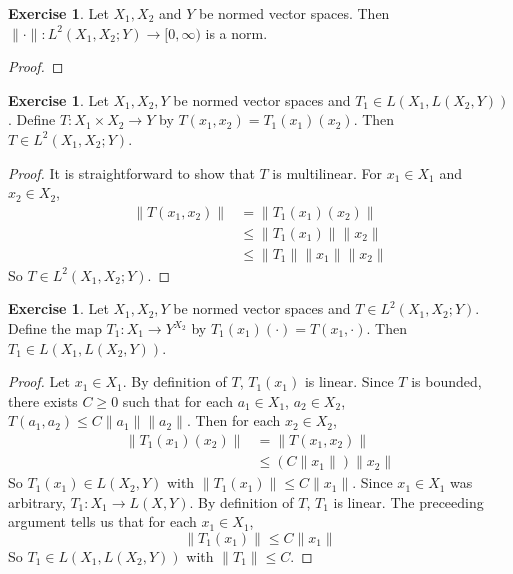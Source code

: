 \documentclass[12pt]{amsart}
\theoremstyle{definition}
\newtheorem{ex}[definition]{Exercise}
\newcommand{\lex}[1]{\label{ex:#1}}
\begin{document}
	\begin{ex}
	Let $X_1, X_2$ and $Y$ be normed vector spaces. Then $\|\cdot\|: L^2(X_1, X_2; Y) \rightarrow [0, \infty)$ is a norm. 
	\end{ex}
	
	\begin{proof}
	
	\end{proof}
	
	\begin{ex} \lex{43003}
	Let $X_1, X_2, Y$ be normed vector spaces and $T_1 \in L(X_1, L(X_2, Y))$. Define $T:X_1 \times X_2 \rightarrow Y$ by $T(x_1, x_2) = T_1(x_1)(x_2)$. Then $T \in L^2(X_1, X_2; Y)$.  
	\end{ex}
	
	\begin{proof}
	It is straightforward to show that $T$ is multilinear. For $x_1 \in X_1$ and $x_2 \in X_2$, 
	\begin{align*}
	\|T(x_1, x_2)\| 
	&= \|T_1(x_1)(x_2)\| \\
	& \leq \|T_1(x_1)\| \|x_2\| \\
	& \leq \|T_1\| \|x_1\| \|x_2\|
	\end{align*}
	So $T \in L^2(X_1, X_2;Y)$.
	\end{proof}
	
	\begin{ex} \lex{43004}
	Let $X_1, X_2, Y$ be normed vector spaces and $T \in L^2(X_1, X_2; Y)$. Define the map $T_1 : X_1 \rightarrow  Y^{X_2}$ by  $T_1(x_1)(\cdot) = T(x_1, \cdot)$. Then $T_1 \in L(X_1, L(X_2, Y))$.
	\end{ex}
	
	\begin{proof}
	Let $x_1 \in X_1$. By definition of $T$, $T_1(x_1)$ is linear. Since $T$ is bounded, there exists $C \geq 0$ such that for each $a_1 \in X_1$, $a_2 \in X_2$, $T(a_1, a_2) \leq C\|a_1\| \|a_2\|$. Then for each $x_2 \in X_2$,
	\begin{align*}
	\| T_1(x_1)(x_2) \|
	&= \|T(x_1, x_2) \| \\
	&\leq (C\|x_1\|) \|x_2\| 
	\end{align*}
	So $T_1(x_1) \in L(X_2,Y)$ with $\|T_1(x_1)\| \leq C\|x_1\|$. Since $x_1 \in X_1$ was arbitrary, $T_1: X_1 \rightarrow L(X,Y)$. By definition of $T$, $T_1$ is linear. The preceeding argument tells us that for each $x_1 \in X_1$, $$\|T_1(x_1)\| \leq C\|x_1\|$$ 
	So $T_1 \in L(X_1, L(X_2, Y))$ with $\|T_1\| \leq C$.  
	\end{proof}	
	
\end{document}
